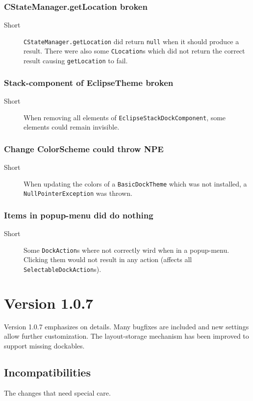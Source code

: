 \documentclass[a4paper,10pt]{article}
\newcommand{\src}[1]{\lstinline[basicstyle=\normalsize\ttfamily,keywordstyle=\normalsize\ttfamily,identifierstyle=\normalsize\ttfamily]|#1|}
\newcommand{\short}{\item[Short]}
\begin{document}
\subsubsection{CStateManager.getLocation broken}
\begin{description}
 \short \src{CStateManager.getLocation} did return \src{null} when it should produce a result. There were also some \src{CLocation}s which did not return the correct result causing \src{getLocation} to fail.
\end{description}

\subsubsection{Stack-component of EclipseTheme broken}
\begin{description}
 \short When removing all elements of \src{EclipseStackDockComponent}, some elements could remain invisible.
\end{description}

\subsubsection{Change ColorScheme could throw NPE}
\begin{description}
 \short When updating the colors of a \src{BasicDockTheme} which was not installed, a \src{NullPointerException} was thrown.
\end{description}

\subsubsection{Items in popup-menu did do nothing}
\begin{description}
 \short Some \src{DockAction}s where not correctly wird when in a popup-menu. Clicking them would not result in any action (affects all \\\src{SelectableDockAction}s).
\end{description}

\section{Version 1.0.7}
Version 1.0.7 emphasizes on details. Many bugfixes are included and new settings allow further customization. The layout-storage mechanism has been improved to support missing dockables.

\subsection{Incompatibilities}
The changes that need special care.
\end{document}
